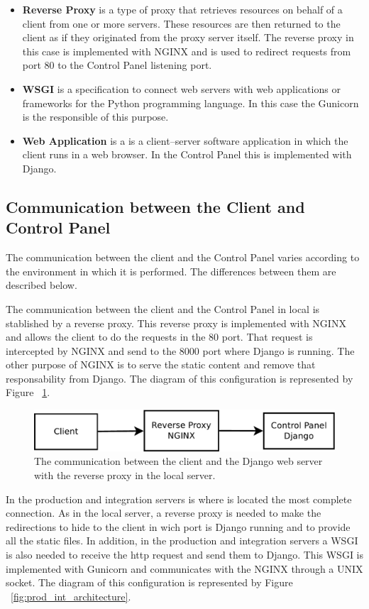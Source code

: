 \documentclass[a4paper,12pt]{article}
\begin{document}
\begin{itemize}
    \item \textbf{Reverse Proxy} is a type of proxy that retrieves resources on behalf of a client from one or more servers.
    These resources are then returned to the client as if they originated from the proxy server itself. The reverse proxy in this case is
    implemented with NGINX and is used to redirect requests from port 80 to the Control Panel listening port.
    \item \textbf{WSGI} is a specification to connect web servers with web applications or frameworks for the Python programming language.
    In this case the Gunicorn is the responsible of this purpose.
    \item \textbf{Web Application} is a is a client–server software application in which the client runs in a web browser. In the Control Panel this
    is implemented with Django.
\end{itemize}

\subsection{Communication between the Client and Control Panel}
The communication between the client and the Control Panel varies according to the environment in which it is performed.
The differences between them are described below.

The communication between the client and the Control Panel in local is stablished by a reverse proxy. This reverse proxy is implemented with
NGINX and allows the client to do the requests in the 80 port. That request is intercepted by NGINX and send to the 8000
port where Django is running. The other purpose of NGINX is to serve the static content and remove that responsability from Django.
The diagram of this configuration is represented by Figure ~\ref{fig:local_architecture}.

\begin{figure}[!ht]
    \centering
    \includegraphics[width=0.7\columnwidth]{images/local}
    \caption{The communication between the client and the Django web server with the reverse proxy in the local server.}
    \label{fig:local_architecture}
\end{figure}

In the production and integration servers is where is located the most complete connection. As in the local server, a reverse proxy is needed to
make the redirections to hide to the client in wich port is Django running and to provide all the static files. In addition, in the production
and integration servers a WSGI is also needed to receive the http request and send them to Django. This WSGI is implemented with Gunicorn and
communicates with the NGINX through a UNIX socket. The diagram of this configuration is represented by Figure ~\ref{fig:prod_int_architecture}.
\end{document}
